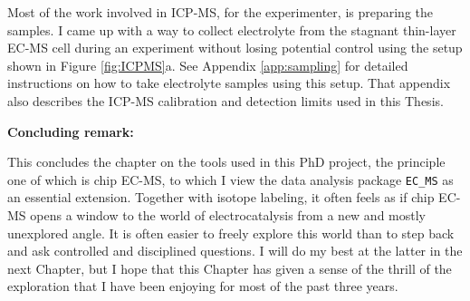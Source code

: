 Most of the work involved in ICP-MS, for the experimenter, is preparing the samples. I came up with a way to collect electrolyte from the stagnant thin-layer EC-MS cell during an experiment without losing potential control using the setup shown in Figure \ref{fig:ICPMS}a. See Appendix \ref{app:sampling} for detailed instructions on how to take electrolyte samples using this setup. That appendix also describes the ICP-MS calibration and detection limits used in this Thesis.

\vspace{5mm}
\textbf{Concluding remark:}

This concludes the chapter on the tools used in this PhD project, the principle one of which is chip EC-MS, to which I view the data analysis package \texttt{EC\_MS} as an essential extension. Together with isotope labeling, it often feels as if chip EC-MS opens a window to the world of electrocatalysis from a new and mostly unexplored angle. It is often easier to freely explore this world than to step back and ask controlled and disciplined questions. I will do my best at the latter in the next Chapter, but I hope that this Chapter has given a sense of the thrill of the exploration that I have been enjoying for most of the past three years.
